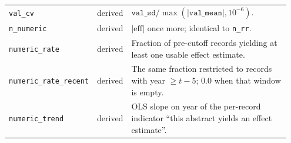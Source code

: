 \documentclass[11pt]{article}
\begin{document}
\begin{longtable}{@{}p{0.215\linewidth}p{0.105\linewidth}p{0.63\linewidth}@{}}
\texttt{val\_cv} & derived & $\texttt{val\_sd}/\max(|\texttt{val\_mean}|,10^{-6})$. \\
\texttt{n\_numeric} & derived & $|\mathrm{eff}|$ once more; identical to \texttt{n\_rr}. \\
\texttt{numeric\_rate} & derived & Fraction of pre-cutoff records yielding at least one usable effect estimate. \\
\texttt{numeric\_rate\_recent} & derived & The same fraction restricted to records with year $\ge t-5$; 0.0 when that window is empty. \\
\texttt{numeric\_trend} & derived & OLS slope on year of the per-record indicator ``this abstract yields an effect estimate''. \\
\end{longtable}
\endgroup
\twocolumn
% 
\end{document}
